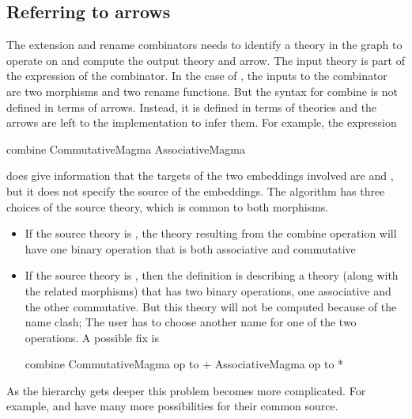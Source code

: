\subsection{Referring to arrows}
\label{subsec:overPart}
The extension and rename combinators needs to identify a theory in the graph to operate on and compute the output theory and arrow. The input theory is part of the expression of the combinator. 
In the case of , the inputs to the combinator are two morphisms and two rename functions. But the syntax for combine is not defined in terms of arrows. Instead, it is defined in terms of theories and the arrows are left to the implementation to infer them. 
For example, the expression 
\begin{togcode}
combine CommutativeMagma {} AssociativeMagma {}
\end{togcode}
does give information that the targets of the two embeddings involved are  and , but it does not specify the source of the embeddings. The algorithm has three choices of the source theory, which is common to both morphisms. 
\begin{itemize}
    \item If the source theory is , the theory resulting from the combine operation will have one binary operation that is both associative and commutative 
    \item If the source theory is , then the definition is describing a theory (along with the related morphisms) that has two binary operations, one associative and the other commutative. But this theory will not be computed because of the name clash; The user has to choose another name for one of the two operations. A possible fix is 
    \begin{togcode}
combine CommutativeMagma {op to +} AssociativeMagma {op to *}
    \end{togcode}
\end{itemize}
As the hierarchy gets deeper this problem becomes more complicated. For example,  and  have many more possibilities for their common source. 

